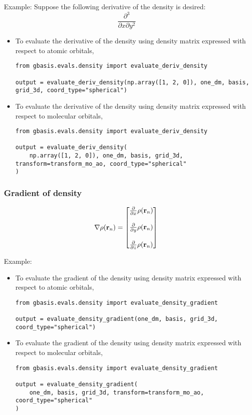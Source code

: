 \documentclass[letterpaper]{article}
\begin{document}
Example:
Suppose the following derivative of the density is desired:
\begin{equation}
  \frac{\partial^3}{\partial x \partial y^2}
\end{equation}
\begin{itemize}
\item To evaluate the derivative of the density using density matrix expressed
  with respect to atomic orbitals,
  \begin{lstlisting}[xleftmargin=-25pt]
from gbasis.evals.density import evaluate_deriv_density

output = evaluate_deriv_density(np.array([1, 2, 0]), one_dm, basis, grid_3d, coord_type="spherical")
\end{lstlisting}
\item To evaluate the derivative of the density using density matrix expressed
  with respect to molecular orbitals,
\begin{lstlisting}
from gbasis.evals.density import evaluate_deriv_density

output = evaluate_deriv_density(
    np.array([1, 2, 0]), one_dm, basis, grid_3d, transform=transform_mo_ao, coord_type="spherical"
)
\end{lstlisting}
\end{itemize}
\subsubsection{Gradient of density}
\begin{equation}
  \nabla \rho(\mathbf{r}_n)
  =
  \begin{bmatrix}
    \frac{\partial}{\partial x} \rho(\mathbf{r}_n)\\\\
    \frac{\partial}{\partial y} \rho(\mathbf{r}_n)\\\\
    \frac{\partial}{\partial z} \rho(\mathbf{r}_n)
  \end{bmatrix}\\
\end{equation}

Example:
\begin{itemize}
\item To evaluate the gradient of the density using density matrix expressed
  with respect to atomic orbitals,
  \begin{lstlisting}[xleftmargin=-25pt]
from gbasis.evals.density import evaluate_density_gradient

output = evaluate_density_gradient(one_dm, basis, grid_3d, coord_type="spherical")
\end{lstlisting}
\item To evaluate the gradient of the density using density matrix expressed
  with respect to molecular orbitals,
  \begin{lstlisting}[xleftmargin=-25pt]
from gbasis.evals.density import evaluate_density_gradient

output = evaluate_density_gradient(
    one_dm, basis, grid_3d, transform=transform_mo_ao, coord_type="spherical"
)
\end{lstlisting}
\end{itemize}
\end{document}

